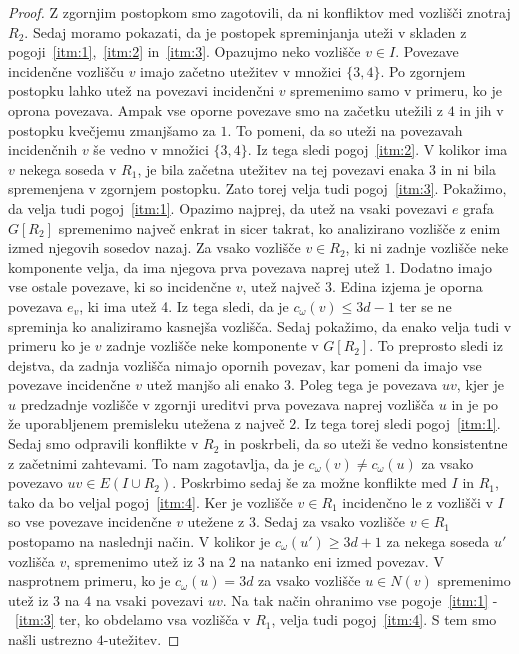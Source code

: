 \documentclass[12pt,a4paper,twoside]{article}
\theoremstyle{definition} %
\theoremstyle{plain} %
\numberwithin{equation}{section}  %
\begin{document}
\begin{proof}
Z zgornjim postopkom smo zagotovili, da ni konfliktov med vozlišči znotraj $R_2$. Sedaj moramo pokazati, da je postopek spreminjanja uteži v skladen z pogoji~\ref{itm:1},~\ref{itm:2} in~\ref{itm:3}. Opazujmo neko vozlišče $v \in I$. Povezave incidenčne vozlišču $v$ imajo začetno utežitev v množici $\{3,4\}$. Po zgornjem postopku lahko utež na povezavi incidenčni $v$ spremenimo samo v primeru, ko je oprona povezava. Ampak vse oporne povezave smo na začetku utežili z $4$ in jih v postopku kvečjemu zmanjšamo za $1$. To pomeni, da so uteži na povezavah incidenčnih $v$ še vedno v množici $\{3,4\}$. Iz tega sledi pogoj~\ref{itm:2}. V kolikor ima $v$ nekega soseda v $R_1$, je bila začetna utežitev na tej povezavi enaka $3$ in ni bila spremenjena v zgornjem postopku. Zato torej velja tudi pogoj~\ref{itm:3}. Pokažimo, da velja tudi pogoj~\ref{itm:1}. Opazimo najprej, da utež na vsaki povezavi $e$ grafa $G[R_2]$ spremenimo največ enkrat in sicer takrat, ko analizirano vozlišče z enim izmed njegovih sosedov nazaj. Za vsako vozlišče $v \in R_2$, ki ni zadnje vozlišče neke komponente velja, da ima njegova prva povezava naprej utež $1$. Dodatno imajo vse ostale povezave, ki so incidenčne $v$, utež največ $3$. Edina izjema je oporna povezava $e_v$, ki ima utež 4. Iz tega sledi, da je $c_{\omega}(v) \le 3d - 1$ ter se ne spreminja ko analiziramo kasnejša vozlišča. Sedaj pokažimo, da enako velja tudi v primeru ko je $v$ zadnje vozlišče neke komponente v $G[R_2]$. To preprosto sledi iz dejstva, da zadnja vozlišča nimajo opornih povezav, kar pomeni da imajo vse povezave incidenčne $v$ utež manjšo ali enako $3$. Poleg tega je povezava $uv$, kjer je $u$ predzadnje vozlišče v zgornji ureditvi prva povezava naprej vozlišča $u$ in je po že uporabljenem premisleku utežena z največ $2$. Iz tega torej sledi pogoj~\ref{itm:1}.
Sedaj smo odpravili konflikte v $R_2$ in poskrbeli, da so uteži še vedno konsistentne z začetnimi zahtevami. To nam zagotavlja, da je $c_{\omega}(v) \neq c_{\omega}(u)$ za vsako povezavo $uv \in E(I \cup R_2)$. Poskrbimo sedaj še za možne konflikte med $I$ in $R_1$, tako da bo veljal pogoj~\ref{itm:4}. Ker je vozlišče $v \in R_1$ incidenčno le z vozlišči v $I$ so vse povezave incidenčne $v$ utežene z $3$. Sedaj za vsako vozlišče $v \in R_1$ postopamo na naslednji način. V kolikor je $c_{\omega}(u') \ge 3d + 1$ za nekega soseda $u'$ vozlišča $v$, spremenimo utež iz $3$ na $2$ na natanko eni izmed povezav. V nasprotnem primeru, ko je $c_{\omega}(u) = 3d$ za vsako vozlišče $u \in N(v)$ spremenimo utež  iz $3$ na $4$ na vsaki povezavi $uv$. Na tak način ohranimo vse pogoje~\ref{itm:1} -~\ref{itm:3} ter, ko obdelamo vsa vozlišča v $R_1$, velja tudi pogoj~\ref{itm:4}. S tem smo našli ustrezno $4$-utežitev.
\end{proof}
\end{document}
